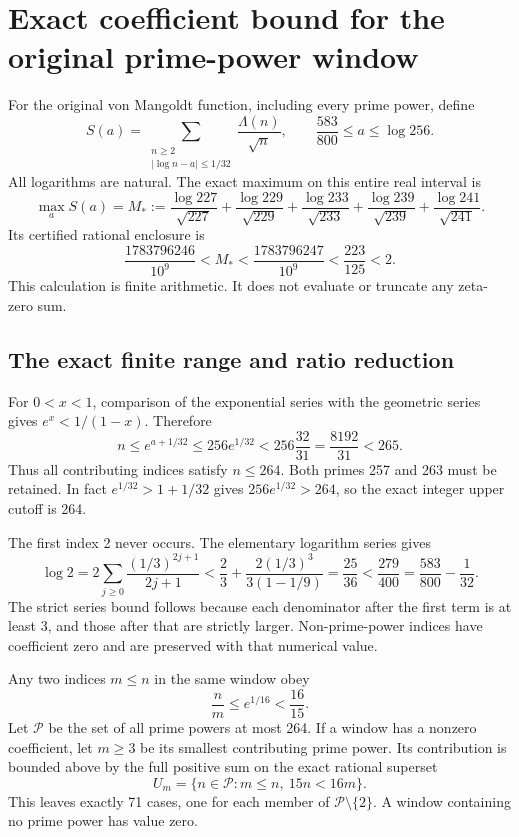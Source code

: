 \documentclass[
  10pt,
  a4paper,
]{article}
\author{}
\date{}
\begin{document}
{
\setcounter{tocdepth}{3}
\tableofcontents
}
\section{Exact coefficient bound for the original prime-power
window}\label{exact-coefficient-bound-for-the-original-prime-power-window}

For the original von Mangoldt function, including every prime power,
define \[
S(a)=\sum_{\substack{n\ge2\\|\log n-a|\le1/32}}
\frac{\Lambda(n)}{\sqrt n},
\qquad \frac{583}{800}\le a\le\log256.
\tag{FPC1}
\] All logarithms are natural. The exact maximum on this entire real
interval is \[
\boxed{
\max_a S(a)=M_*:=
\frac{\log227}{\sqrt{227}}+
\frac{\log229}{\sqrt{229}}+
\frac{\log233}{\sqrt{233}}+
\frac{\log239}{\sqrt{239}}+
\frac{\log241}{\sqrt{241}}.
}
\tag{FPC2}
\] Its certified rational enclosure is \[
\frac{1783796246}{10^9}<M_*<\frac{1783796247}{10^9}
<\boxed{\frac{223}{125}}<2.
\tag{FPC3}
\] This calculation is finite arithmetic. It does not evaluate or
truncate any zeta-zero sum.

\subsection{The exact finite range and ratio
reduction}\label{the-exact-finite-range-and-ratio-reduction}

For \(0<x<1\), comparison of the exponential series with the geometric
series gives \(e^x<1/(1-x)\). Therefore \[
n\le e^{a+1/32}\le256e^{1/32}
<256\frac{32}{31}=\frac{8192}{31}<265.
\tag{FPC4}
\] Thus all contributing indices satisfy \(n\le264\). Both primes 257
and 263 must be retained. In fact \(e^{1/32}>1+1/32\) gives
\(256e^{1/32}>264\), so the exact integer upper cutoff is 264.

The first index 2 never occurs. The elementary logarithm series gives \[
\log2=2\sum_{j\ge0}\frac{(1/3)^{2j+1}}{2j+1}
<\frac23+\frac{2(1/3)^3}{3(1-1/9)}
=\frac{25}{36}<\frac{279}{400}
=\frac{583}{800}-\frac1{32}.
\tag{FPC5}
\] The strict series bound follows because each denominator after the
first term is at least 3, and those after that are strictly larger.
Non-prime-power indices have coefficient zero and are preserved with
that numerical value.

Any two indices \(m\le n\) in the same window obey \[
\frac nm\le e^{1/16}<\frac{16}{15}.
\tag{FPC6}
\] Let \(\mathcal P\) be the set of all prime powers at most 264. If a
window has a nonzero coefficient, let \(m\ge3\) be its smallest
contributing prime power. Its contribution is bounded above by the full
positive sum on the exact rational superset \[
U_m=\{n\in\mathcal P:m\le n,\ 15n<16m\}.
\tag{FPC7}
\] This leaves exactly 71 cases, one for each member of
\(\mathcal P\setminus\{2\}\). A window containing no prime power has
value zero.
\end{document}
